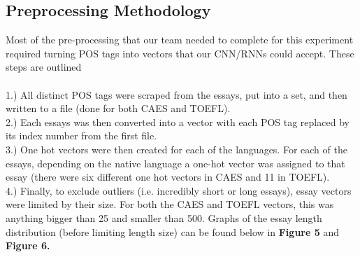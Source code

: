 \documentclass[11pt,a4paper]{article}
\newcommand\tab[1][1cm]{\hspace*{#1}}
\begin{document}
\subsection{Preprocessing Methodology}
\tab Most of the pre-processing that our team needed to complete for this experiment required turning POS tags into vectors that our CNN/RNNs could accept. These steps are outlined\\
\\
1.) All distinct POS tags were scraped from the essays, put into a set, and then written to a file (done for both CAES and TOEFL).\\
2.) Each essays was then converted into a vector with each POS tag replaced by its index number from the first file.\\
3.) One hot vectors were then created for each of the languages. For each of the essays, depending on the native language a  one-hot vector was assigned to that essay (there were six different one hot vectors in CAES and 11 in TOEFL).\\
4.) Finally, to exclude outliers (i.e. incredibly short or long essays), essay vectors were limited by their size. For both the CAES and TOEFL vectors, this was anything bigger than 25 and smaller than 500. Graphs of the essay length distribution (before limiting length size) can be found below in \textbf{Figure 5} and \textbf{Figure 6.}
\end{document}

